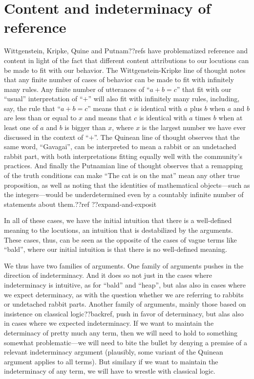 \section{Content and indeterminacy of reference}
Wittgenstein, Kripke, Quine and Putnam??refs have problematized reference and content in light of the fact that different
content attributions to our locutions can be made to fit with our behavior. The Wittgenstein-Kripke line of thought notes
that any finite number of cases of behavior can be made to fit with infinitely many rules. Any finite number of utterances
of ``$a+b=c$'' that fit with our ``usual'' interpretation of ``$+$'' will also fit with infinitely many rules, including,
say, the rule that ``$a+b=c$'' means that $c$ is identical with $a$ plus $b$ when $a$ and $b$ are less than or equal to $x$ and 
means that $c$ is identical with $a$ times $b$ when at least one of $a$ and $b$ is bigger than $x$, where $x$ is the largest
number we have ever discussed in the context of ``$+$''. The Quinean line of thought observes that the same word, ``Gavagai'',
can be interpreted to mean a rabbit or an undetached rabbit part, with both interpretations fitting equally well with the
community's practices. And finally the Putnamian line of thought observes that a remapping of the truth conditions can make
``The cat is on the mat'' mean any other true proposition, as well as noting that the identities of mathematical objects---such as
the integers---would be underdetermined even by a countably infinite number of statements about them.??ref ??expand-and-exposit

In all of these cases, we have the initial intuition that there is a well-defined meaning to the locutions, an intuition that
is destabilized by the arguments. These cases, thus, can be seen as the opposite of the cases of vague terms like ``bald'', where
our initial intuition is that there is no well-defined meaning.

We thus have two families of arguments. One family of arguments pushes in the direction of indeterminacy. And it does so not
just in the cases where indeterminacy is intuitive, as for ``bald'' and ``heap'', but alas also in cases where we expect determinacy,
as with the question whether we are referring to rabbits or undetached rabbit parts. Another family of arguments, mainly those
based on insistence on classical logic??backref, push in favor of determinacy, but alas also in cases where we expected indeterminacy.
If we want to maintain the determinacy of pretty much any term, then we will need to hold to something somewhat problematic---we will
need to bite the bullet by denying a premise of a relevant indeterminacy argument (plausibly, some variant of the Quinean argument 
applies to all terms). But similary if we want to maintain the indeterminacy of any term, we will have to wrestle with classical
logic. 

